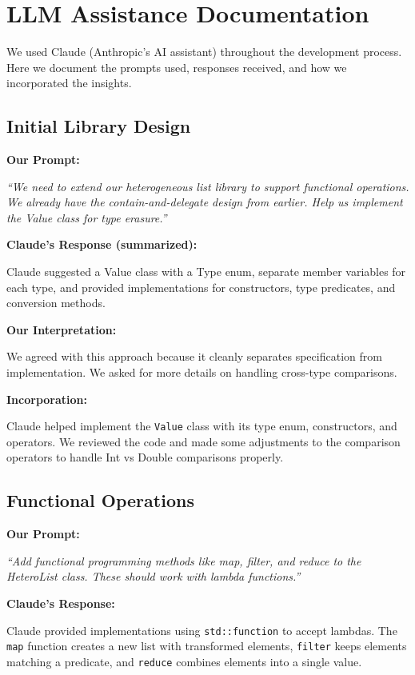 \documentclass[11pt,a4paper]{article}
\begin{document}
\section{LLM Assistance Documentation}

We used Claude (Anthropic's AI assistant) throughout the development process. Here we document the prompts used, responses received, and how we incorporated the insights.

\subsection{Initial Library Design}

\textbf{Our Prompt:}

\textit{``We need to extend our heterogeneous list library to support functional operations. We already have the contain-and-delegate design from earlier. Help us implement the Value class for type erasure.''}

\textbf{Claude's Response (summarized):}

Claude suggested a Value class with a Type enum, separate member variables for each type, and provided implementations for constructors, type predicates, and conversion methods.

\textbf{Our Interpretation:}

We agreed with this approach because it cleanly separates specification from implementation. We asked for more details on handling cross-type comparisons.

\textbf{Incorporation:}

Claude helped implement the \texttt{Value} class with its type enum, constructors, and operators. We reviewed the code and made some adjustments to the comparison operators to handle Int vs Double comparisons properly.

\subsection{Functional Operations}

\textbf{Our Prompt:}

\textit{``Add functional programming methods like map, filter, and reduce to the HeteroList class. These should work with lambda functions.''}

\textbf{Claude's Response:}

Claude provided implementations using \texttt{std::function} to accept lambdas. The \texttt{map} function creates a new list with transformed elements, \texttt{filter} keeps elements matching a predicate, and \texttt{reduce} combines elements into a single value.
\end{document}
